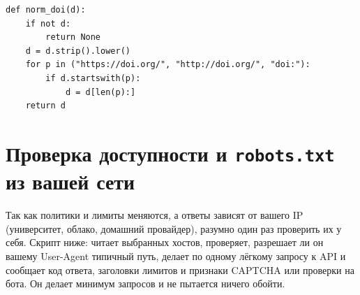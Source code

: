 \documentclass[11pt,a4paper]{article}
\newcommand{\code}[1]{\texttt{\detokenize{#1}}}
\begin{document}
\begin{lstlisting}[caption={Вежливый HTTP-клиент с паузами по хостам, повторами и кэшем}]
def norm_doi(d):
    if not d:
        return None
    d = d.strip().lower()
    for p in ("https://doi.org/", "http://doi.org/", "doi:"):
        if d.startswith(p):
            d = d[len(p):]
    return d
\end{lstlisting}

\section{Проверка доступности и \texttt{robots.txt} из вашей сети}\label{sec:probe}

Так как политики и лимиты меняются, а ответы зависят от вашего IP (университет, облако, домашний провайдер), разумно один раз проверить их у себя. Скрипт ниже: читает \code{robots.txt} выбранных хостов, проверяет, разрешает ли он вашему User-Agent типичный путь, делает по одному лёгкому запросу к API и сообщает код ответа, заголовки лимитов и признаки CAPTCHA или проверки на бота. Он делает минимум запросов и не пытается ничего обойти.
\end{document}
